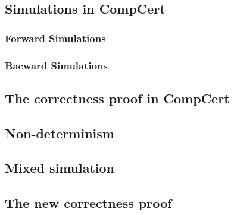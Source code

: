 \label{sec:mixedsim}
\subsection{Simulations in CompCert}
\subsubsection{Forward Simulations}
\subsubsection{Bacward Simulations}
\subsection{The correctness proof in CompCert}
\subsection{Non-determinism}
\subsection{Mixed simulation}
\subsection{The new correctness proof}
